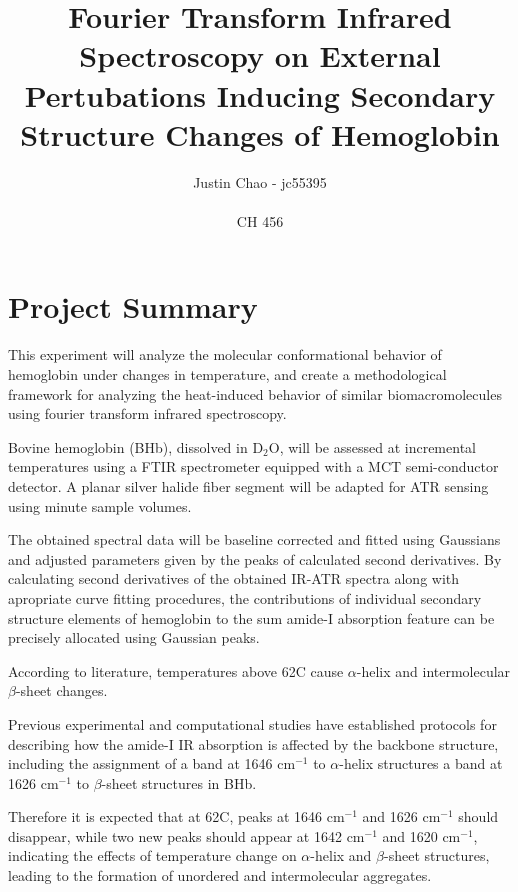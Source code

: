 \documentclass{article}
\begin{document}
 
\title {Fourier Transform Infrared Spectroscopy on External Pertubations
Inducing Secondary Structure Changes of Hemoglobin}
\vspace{20cm} 
\author {Justin Chao - jc55395 
\\ \\ CH 456} 

\maketitle

\newpage
\section*{Project Summary}
This experiment will analyze the molecular conformational behavior of hemoglobin under
changes in temperature, and create a methodological framework for analyzing the
heat-induced behavior of similar biomacromolecules using fourier transform
infrared spectroscopy.\cite{hemo}

Bovine hemoglobin (BHb), dissolved in D$_2$O, will be assessed at incremental
temperatures using a FTIR spectrometer equipped with a MCT semi-conductor
detector. A planar silver halide fiber segment will be adapted for ATR sensing
using minute sample volumes.

The obtained spectral data will be baseline corrected and fitted using
Gaussians and adjusted parameters given by the peaks of calculated second
derivatives. By calculating second derivatives of the obtained IR-ATR spectra
along with apropriate curve fitting procedures, the contributions of individual
secondary structure elements of hemoglobin to the sum amide-I absorption feature
can be precisely allocated using Gaussian peaks.

According to literature, temperatures above 62\degree C cause $\alpha$-helix and
intermolecular $\beta$-sheet changes.\cite{hemo}

Previous experimental and computational studies have established protocols for
describing how the amide-I IR absorption is affected by the backbone structure,
including the assignment of a band at 1646 cm$^{-1}$ to $\alpha$-helix structures
a band at 1626 cm$^{-1}$ to $\beta$-sheet structures in BHb. \cite{hemo}

Therefore it is expected that at 62\degree C, peaks at 1646 cm$^{-1}$ and 1626
cm$^{-1}$ should disappear, while two new peaks should appear at 1642 cm$^{-1}$
and 1620 cm$^{-1}$, indicating the effects of temperature change on $\alpha$-helix
and $\beta$-sheet structures, leading to the formation of unordered and
intermolecular aggregates.
 
\end{document}
